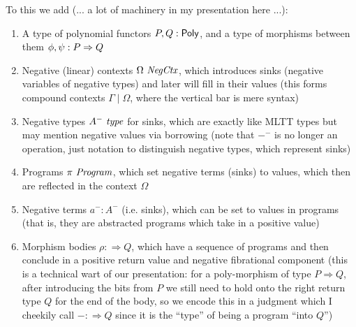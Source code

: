 \documentclass[final]{amsart}
\begin{document}
To this we add (... a lot of machinery in my presentation here ...):
\begin{enumerate}
  \item A type of polynomial functors $P, Q : \mathsf{Poly}$, and a type of morphisms between them $\phi, \psi : P \Rightarrow Q$
  \item Negative (linear) contexts $\Omega\ \mathit{NegCtx}$, which introduces sinks (negative variables of negative types) and later will fill in their values (this forms compound contexts $\Gamma \mid \Omega$, where the vertical bar is mere syntax)
  \item Negative types $A^{-}\, \operatorname{\mathit{type}}$ for sinks, which are exactly like MLTT types but may mention negative values via borrowing (note that ${-}^{-}$ is no longer an operation, just notation to distinguish negative types, which represent sinks)
  \item Programs $\pi\ \mathit{Program}$, which set negative terms (sinks) to values, which then are reflected in the context $\Omega$
  \item Negative terms $a^{-} : A^{-}$ (i.e. sinks), which can be set to values in programs (that is, they are abstracted programs which take in a positive value)
  \item Morphism bodies $\rho :\Rightarrow Q$, which have a sequence of programs and then conclude in a positive return value and negative fibrational component (this is a technical wart of our presentation: for a poly-morphism of type $P \Rightarrow Q$, after introducing the bits from $P$ we still need to hold onto the right return type $Q$ for the end of the body, so we encode this in a judgment which I cheekily call $- :\Rightarrow Q$ since it is the ``type'' of being a program ``into $Q$'')
\end{enumerate}
\end{document}
